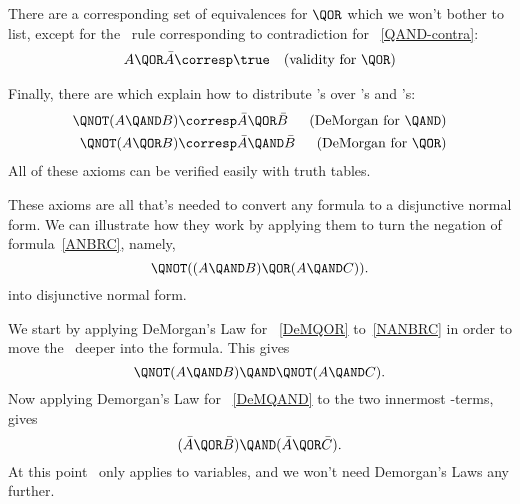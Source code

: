 There are a corresponding set of equivalences for $\QOR$ which we
won't bother to list, except for the \QOR\ rule corresponding to
contradiction for \QAND~\eqref{QAND-contra}:
\begin{align*}
A \QOR \bar{A} & \corresp \true  & \text{(validity for \QOR)}
\end{align*}

\iffalse
There is also a familiar rule connecting \QAND\ and \QOR:
\begin{align}
\lefteqn{A \QAND (B \QOR C)}\notag\\
 & \corresp (A \QAND B) \QOR (A \QAND C) &\qquad \text{(distributivity
  of \QAND\ over \QOR)}\label{qand-distributivity}
\end{align}
\fi

Finally, there are %
which explain how to
distribute \QNOT's over \QAND's and \QOR's:
\begin{align}
\QNOT(A \QAND B) &\corresp \bar{A} \QOR \bar{B} & \text{(DeMorgan for \QAND)} \label{DeMQAND}\\
\QNOT(A \QOR B) &\corresp \bar{A} \QAND \bar{B} & \text{(DeMorgan for \QOR)}
\label{DeMQOR} 
\end{align}
All of these axioms can be verified easily with truth tables.

These axioms are all that's needed to convert any formula to a
disjunctive normal form.  We can illustrate how they work by applying
them to turn the negation of formula~\eqref{ANBRC}, namely,
\begin{equation}\label{NANBRC}
\QNOT((A \QAND B) \QOR (A \QAND C)).
\end{equation}
into disjunctive normal form.

We start by applying DeMorgan's Law for \QOR~\eqref{DeMQOR}
to~\eqref{NANBRC} in order to move the \QNOT\ deeper into the formula.
This gives
\[
\QNOT(A \QAND B) \QAND \QNOT(A \QAND C).
\]
Now applying Demorgan's Law for \QAND~\eqref{DeMQAND} to the two
innermost \QAND-terms, gives
\begin{equation}\label{NAONBANAONC}
(\bar{A} \QOR \bar{B}) \QAND (\bar{A} \QOR \bar{C}).
\end{equation}
At this point \QNOT\ only applies to variables, and we won't need
Demorgan's Laws any further.

